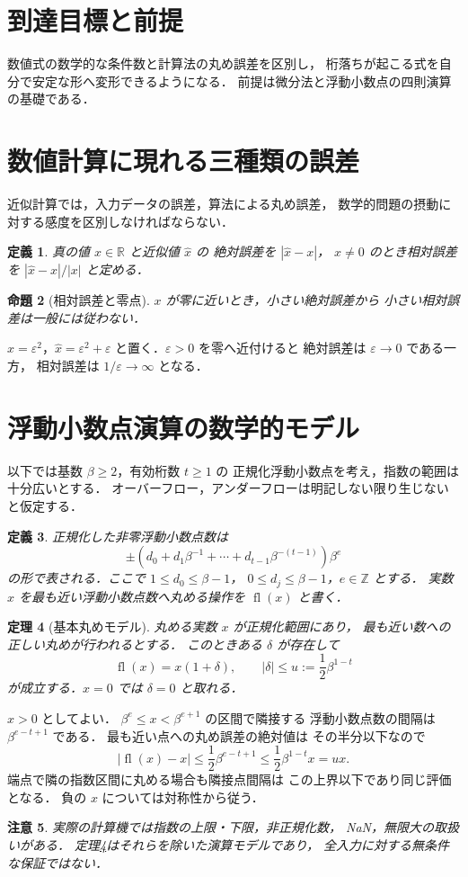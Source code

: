 \documentclass[a5paper,10pt,onecolumn]{jsarticle}
\makeatletter
\theoremstyle{mathnotetheorem}
\newtheorem{theorem}{定理}[section]
\newtheorem{definition}[theorem]{定義}
\newtheorem{proposition}[theorem]{命題}
\newtheorem{remark}[theorem]{注意}
\renewcommand{\proofname}{証明}
\renewenvironment{proof}[1][\proofname]{%
  \par\pushQED{\qed}\normalfont\topsep4\p@\@plus2\p@\relax
  \trivlist\item[\hskip\labelsep\bfseries #1]\ignorespaces
}{\popQED\endtrivlist\@endpefalse}
\makeatother
\begin{document}
\section*{到達目標と前提}
数値式の数学的な条件数と計算法の丸め誤差を区別し，
桁落ちが起こる式を自分で安定な形へ変形できるようになる．
前提は微分法と浮動小数点の四則演算の基礎である．

\section{数値計算に現れる三種類の誤差}
近似計算では，入力データの誤差，算法による丸め誤差，
数学的問題の摂動に対する感度を区別しなければならない．
\begin{definition}
真の値 $x\in\mathbb R$ と近似値 $\widehat x$ の
絶対誤差を $|\widehat x-x|$，
$x\ne0$ のとき相対誤差を
$|\widehat x-x|/|x|$ と定める．
\end{definition}
\begin{proposition}[相対誤差と零点]
$x$ が零に近いとき，小さい絶対誤差から
小さい相対誤差は一般には従わない．
\end{proposition}
\begin{proof}
$x=\varepsilon^2$，$\widehat x=\varepsilon^2+\varepsilon$
と置く．$\varepsilon>0$ を零へ近付けると
絶対誤差は $\varepsilon\to0$ である一方，
相対誤差は $1/\varepsilon\to\infty$ となる．
\end{proof}
\section{浮動小数点演算の数学的モデル}
以下では基数 $\beta\ge2$，有効桁数 $t\ge1$ の
正規化浮動小数点を考え，指数の範囲は十分広いとする．
オーバーフロー，アンダーフローは明記しない限り生じないと仮定する．
\begin{definition}
正規化した非零浮動小数点数は
\[
 \pm(d_0+d_1\beta^{-1}+\cdots+d_{t-1}\beta^{-(t-1)})
   \beta^e
\]
の形で表される．ここで $1\le d_0\le\beta-1$，
$0\le d_j\le\beta-1$，$e\in\mathbb Z$ とする．
実数 $x$ を最も近い浮動小数点数へ丸める操作を
$\operatorname{fl}(x)$ と書く．
\end{definition}
\begin{theorem}[基本丸めモデル]\label{thm:rounding}
丸める実数 $x$ が正規化範囲にあり，
最も近い数への正しい丸めが行われるとする．
このときある $\delta$ が存在して
\[
 \operatorname{fl}(x)=x(1+\delta),\qquad
 |\delta|\le u:=\frac12\beta^{1-t}
\]
が成立する．$x=0$ では $\delta=0$ と取れる．
\end{theorem}
\begin{proof}
$x>0$ としてよい．
$\beta^e\le x<\beta^{e+1}$ の区間で隣接する
浮動小数点数の間隔は $\beta^{e-t+1}$ である．
最も近い点への丸め誤差の絶対値は
その半分以下なので
\[
 |\operatorname{fl}(x)-x|
 \le\frac12\beta^{e-t+1}
 \le\frac12\beta^{1-t}x=ux.
\]
端点で隣の指数区間に丸める場合も隣接点間隔は
この上界以下であり同じ評価となる．
負の $x$ については対称性から従う．
\end{proof}
\begin{remark}
実際の計算機では指数の上限・下限，非正規化数，
NaN，無限大の取扱いがある．
定理\ref{thm:rounding}はそれらを除いた演算モデルであり，
全入力に対する無条件な保証ではない．
\end{remark}
\end{document}
